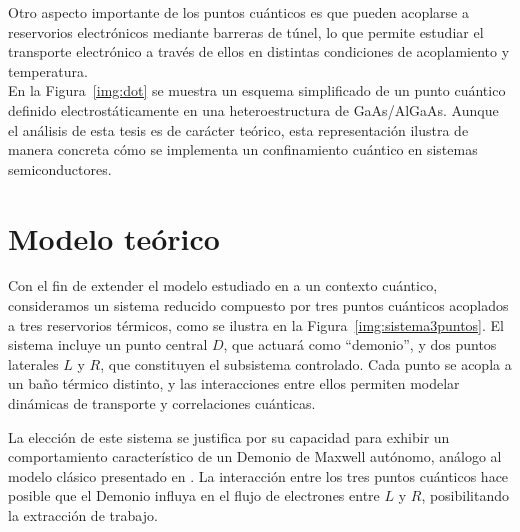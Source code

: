 Otro aspecto importante de los puntos cuánticos es que pueden acoplarse a reservorios electrónicos mediante barreras de túnel, lo que permite estudiar el transporte electrónico a través de ellos en distintas condiciones de acoplamiento y temperatura.
\\

En la Figura~\ref{img:dot} se muestra un esquema simplificado de un punto cuántico definido electrostáticamente en una heteroestructura de GaAs/AlGaAs. Aunque el análisis de esta tesis es de carácter teórico, esta representación ilustra de manera concreta cómo se implementa un confinamiento cuántico en sistemas semiconductores.


\section{Modelo teórico}
\label{modeloteorico}
Con el fin de extender el modelo estudiado en \cite{horowitz2014thermodynamics} a un contexto cuántico, consideramos un sistema reducido compuesto por tres puntos cuánticos acoplados a tres reservorios térmicos, como se ilustra en la Figura~\ref{img:sistema3puntos}. El sistema incluye un punto central $D$, que actuará como ``demonio'', y dos puntos laterales $L$ y $R$, que constituyen el subsistema controlado. Cada punto se acopla a un baño térmico distinto, y las interacciones entre ellos permiten modelar dinámicas de transporte y correlaciones cuánticas.



La elección de este sistema se justifica por su capacidad para exhibir un comportamiento característico de un Demonio de Maxwell autónomo, análogo al modelo clásico presentado en \cite{horowitz2014thermodynamics}. La interacción entre los tres puntos cuánticos hace posible que el Demonio influya en el flujo de electrones entre $L$ y $R$, posibilitando la extracción de trabajo. 
\\

